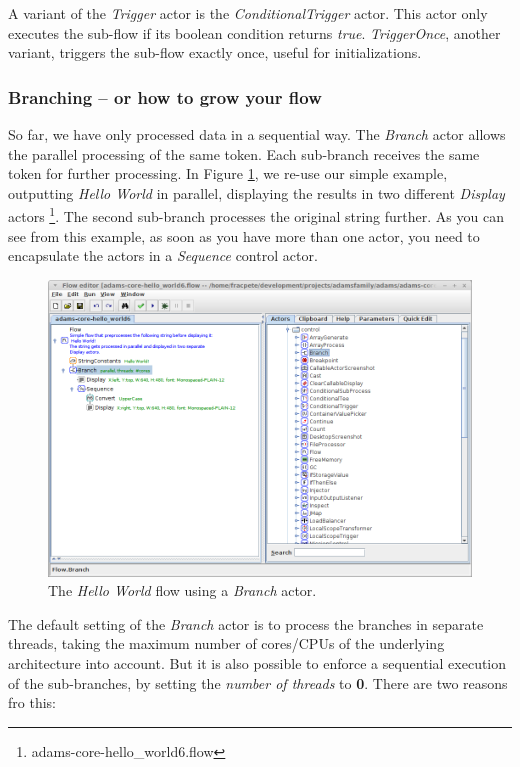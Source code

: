 A variant of the \textit{Trigger} actor is the \textit{ConditionalTrigger}
actor. This actor only executes the sub-flow if its boolean condition returns
\textit{true}. \textit{TriggerOnce}, another variant, triggers the sub-flow 
exactly once, useful for initializations.

\subsubsection{Branching -- or how to grow your flow}
So far, we have only processed data in a sequential way. The \textit{Branch}
actor allows the parallel processing of the same token. Each sub-branch receives
the same token for further processing. In Figure
\ref{floweditor-helloworld-branch_flow}, we re-use our simple example,
outputting \textit{Hello World} in parallel, displaying the results in two
different \textit{Display} actors \footnote{adams-core-hello\_world6.flow}. The
second sub-branch processes the original string further. As you can see from this example, as soon as you have more than
one actor, you need to encapsulate the actors in a \textit{Sequence} control
actor.
\begin{figure}[htb]
  \centering
  \includegraphics[width=12.0cm]{images/floweditor-helloworld-branch_flow.png}
  \caption{The \textit{Hello World} flow using a \textit{Branch} actor.}
  \label{floweditor-helloworld-branch_flow}
\end{figure}
The default setting of the \textit{Branch} actor is to process the branches in
separate threads, taking the maximum number of cores/CPUs of the underlying
architecture into account. But it is also possible to enforce a sequential
execution of the sub-branches, by setting the \textit{number of threads} to
\textbf{0}. There are two reasons fro this:
